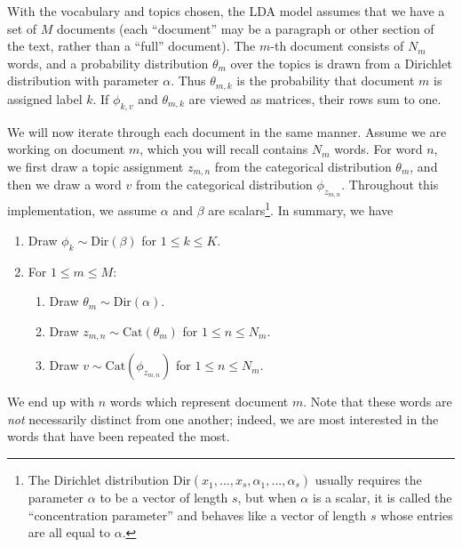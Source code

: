 With the vocabulary and topics chosen, the LDA model assumes that we have a set of $M$ documents (each ``document'' may be a paragraph or other section of the text, rather than a ``full'' document).
The $m$-th document consists of $N_m$ words, and a probability distribution $\theta_{m}$ over the topics is drawn from a Dirichlet distribution with parameter $\alpha$.
Thus $\theta_{m,k}$ is the probability that document $m$ is assigned label $k$.
If $\phi_{k,v}$ and $\theta_{m,k}$ are viewed as matrices, their rows sum to one.


We will now iterate through each document in the same manner.
Assume we are working on document $m$, which you will recall contains $N_{m}$ words.
For word $n$, we first draw a topic assignment $z_{m,n}$ from the categorical distribution $\theta_{m}$, and then we draw a word $v$ from the categorical distribution $\phi_{z_{m,n}}$. 
Throughout this implementation, we assume $\alpha$ and $\beta$ are scalars\footnote{The Dirichlet distribution Dir$(x^{}_{1},...,x^{}_s,\alpha^{}_{1},...,\alpha^{}_s)$ usually requires the parameter $\alpha$ to be a vector of length $s$, but when $\alpha$ is a scalar, it is called the ``concentration parameter'' and behaves like a vector of length $s$ whose entries are all equal to $\alpha$.}.
In summary, we have
\begin{enumerate}
    \item Draw $\phi_{k} \sim \text{Dir}(\beta)$ for $1 \leq k \leq K$.
    \item For $1 \leq m \leq M$:
    \begin{enumerate}
        \item Draw $\theta_{m} \sim \text{Dir}(\alpha)$.
        \item Draw $z_{m,n} \sim \text{Cat}(\theta_{m})$ for $1 \leq n \leq N_{m}$.
        \item Draw $v \sim \text{Cat}(\phi_{z_{m,n}})$ for $1 \leq n \leq N_{m}$.
    \end{enumerate}
\end{enumerate}

We end up with $n$ words which represent document $m$.
Note that these words are \emph{not} necessarily distinct from one another; indeed, we are most interested in the words that have been repeated the most.

